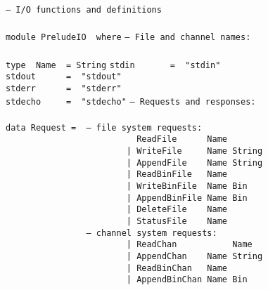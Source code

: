 \noindent\bprogB
\mbox{\tt --\ I/O\ functions\ and\ definitions}\\
\mbox{\tt }\\
\mbox{\tt module\ PreludeIO\ \ where}
\eprogB\noindent\bprogB
\mbox{\tt --\ File\ and\ channel\ names:}\\
\mbox{\tt }\\
\mbox{\tt type\ \ Name\ \ =\ String}
\eprogB\noindent\bprogB
\mbox{\tt stdin\ \ \ \ \ \ \ =\ \ "stdin"}\\
\mbox{\tt stdout\ \ \ \ \ \ =\ \ "stdout"}\\
\mbox{\tt stderr\ \ \ \ \ \ =\ \ "stderr"}\\
\mbox{\tt stdecho\ \ \ \ \ =\ \ "stdecho"}
\eprogB\noindent\bprogB
\mbox{\tt --\ Requests\ and\ responses:}\\
\mbox{\tt }\\
\mbox{\tt data\ Request\ =\ \ --\ file\ system\ requests:}\\
\mbox{\tt \ \ \ \ \ \ \ \ \ \ \ \ \ \ \ \ \ \ \ \ \ \ \ \ \ \ ReadFile\ \ \ \ \ \ Name\ \ \ \ \ \ \ \ \ }\\
\mbox{\tt \ \ \ \ \ \ \ \ \ \ \ \ \ \ \ \ \ \ \ \ \ \ \ \ |\ WriteFile\ \ \ \ \ Name\ String}\\
\mbox{\tt \ \ \ \ \ \ \ \ \ \ \ \ \ \ \ \ \ \ \ \ \ \ \ \ |\ AppendFile\ \ \ \ Name\ String}\\
\mbox{\tt \ \ \ \ \ \ \ \ \ \ \ \ \ \ \ \ \ \ \ \ \ \ \ \ |\ ReadBinFile\ \ \ Name\ }\\
\mbox{\tt \ \ \ \ \ \ \ \ \ \ \ \ \ \ \ \ \ \ \ \ \ \ \ \ |\ WriteBinFile\ \ Name\ Bin}\\
\mbox{\tt \ \ \ \ \ \ \ \ \ \ \ \ \ \ \ \ \ \ \ \ \ \ \ \ |\ AppendBinFile\ Name\ Bin}\\
\mbox{\tt \ \ \ \ \ \ \ \ \ \ \ \ \ \ \ \ \ \ \ \ \ \ \ \ |\ DeleteFile\ \ \ \ Name}\\
\mbox{\tt \ \ \ \ \ \ \ \ \ \ \ \ \ \ \ \ \ \ \ \ \ \ \ \ |\ StatusFile\ \ \ \ Name}\\
\mbox{\tt \ \ \ \ \ \ \ \ \ \ \ \ \ \ \ \ --\ channel\ system\ requests:}\\
\mbox{\tt \ \ \ \ \ \ \ \ \ \ \ \ \ \ \ \ \ \ \ \ \ \ \ \ |\ ReadChan\ \ \ \ \ \ \ \ \ \ \ Name\ }\\
\mbox{\tt \ \ \ \ \ \ \ \ \ \ \ \ \ \ \ \ \ \ \ \ \ \ \ \ |\ AppendChan\ \ \ \ Name\ String}\\
\mbox{\tt \ \ \ \ \ \ \ \ \ \ \ \ \ \ \ \ \ \ \ \ \ \ \ \ |\ ReadBinChan\ \ \ Name\ }\\
\mbox{\tt \ \ \ \ \ \ \ \ \ \ \ \ \ \ \ \ \ \ \ \ \ \ \ \ |\ AppendBinChan\ Name\ Bin}\\
